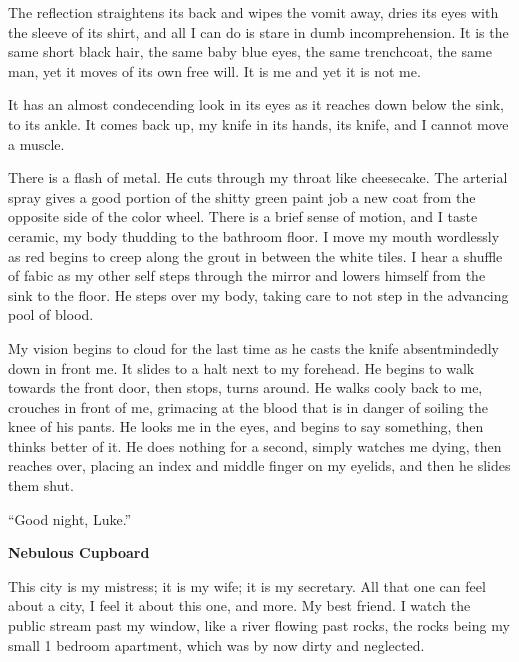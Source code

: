 The reflection straightens its back and wipes the vomit away, dries
its eyes with the sleeve of its shirt, and all I can do is stare in
dumb incomprehension. It is the same short black hair, the same
baby blue eyes, the same trenchcoat, the same man, yet it moves of
its own free will. It is me and yet it is not me.



It has an almost condecending look in its eyes as it reaches down
below the sink, to its ankle. It comes back up, my knife in its
hands, its knife, and I cannot move a muscle.



There is a flash of metal. He cuts through my throat like
cheesecake. The arterial spray gives a good portion of the shitty
green paint job a new coat from the opposite side of the color
wheel. There is a brief sense of motion, and I taste ceramic, my
body thudding to the bathroom floor. I move my mouth wordlessly as
red begins to creep along the grout in between the white tiles. I
hear a shuffle of fabic as my other self steps through the mirror
and lowers himself from the sink to the floor. He steps over my
body, taking care to not step in the advancing pool of blood.



My vision begins to cloud for the last time as he casts the knife
absentmindedly down in front me. It slides to a halt next to my
forehead. He begins to walk towards the front door, then stops,
turns around. He walks cooly back to me, crouches in front of me,
grimacing at the blood that is in danger of soiling the knee of his
pants. He looks me in the eyes, and begins to say something, then
thinks better of it. He does nothing for a second, simply watches
me dying, then reaches over, placing an index and middle finger on
my eyelids, and then he slides them shut.



``Good night, Luke.'' 
 





{\bf Nebulous Cupboard}



This city is my mistress; it is my wife; it is my secretary. All
that one can feel about a city, I feel it about this one, and more.
My best friend. I watch the public stream past my window, like a
river flowing past rocks, the rocks being my small 1 bedroom
apartment, which was by now dirty and neglected.



